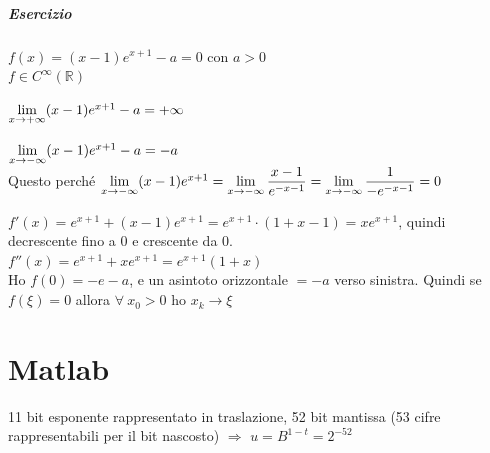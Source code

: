 \documentclass[10pt]{book}
\begin{document}
\paragraph{Esercizio} $f(x) = (x-1)e^{x+1} - a = 0$ con $a > 0$\\
$f\in C^\infty(\mathbb{R})$
\begin{list}{}{}
	\item $\mathlarger{\lim_{x\to+\infty}} (x-1)e^{x+1} - a = +\infty$
	\item $\mathlarger{\lim_{x\to-\infty}} (x-1)e^{x+1} - a = -a$\\
	Questo perché $\mathlarger{\lim_{x\to-\infty}} (x-1)e^{x+1} = \mathlarger{\lim_{x\to-\infty} \frac{x-1}{e^{-x-1}}} = \mathlarger{\lim_{x\to-\infty} \frac{1}{-e^{-x-1}}} = 0$
\end{list}
$f'(x) = e^{x+1} + (x-1)e^{x+1} = e^{x+1}\cdot(1 + x - 1) = xe^{x+1}$, quindi decrescente fino a 0 e crescente da 0.\\
$f''(x) = e^{x+1} + xe^{x+1} = e^{x+1}(1+x)$\\
Ho $f(0) = -e -a$, e un asintoto orizzontale $= -a$ verso sinistra. Quindi se $f(\xi) = 0$ allora $\forall\:x_0>0$ ho $x_k \rightarrow \xi$
\chapter{Matlab}
11 bit esponente rappresentato in traslazione, 52 bit mantissa (53 cifre rappresentabili per il bit nascosto) $\Rightarrow$ $u = B^{1-t} = 2^{-52}$
\end{document}
